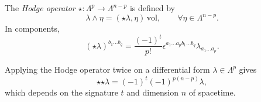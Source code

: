 \begin{definition}
  The \emph{Hodge operator} $\star \colon \Lambda^p \to \Lambda^{n -p}$ is defined by
  \begin{equation}
    \lambda \wedge \eta = (\star \lambda, \eta) \, \text{vol}, \qquad \forall \eta \in \Lambda^{n - p}.
  \end{equation}
  In components,
  \begin{equation}
    (\star \lambda)^{b_1 \dots b_q} = \frac{(-1)^{t}}{p!} \epsilon^{a_1 \dots a_p b_1 \dots b_q}  \lambda_{a_1 \dots a_p}.
  \end{equation}
\end{definition}
\begin{claim}
  Applying the Hodge operator twice on a differential form $\lambda \in \Lambda^p$ gives
  \begin{equation}
    {\star {\star \lambda}} = (-1)^t (-1)^{p (n - p)} \lambda,
  \end{equation}
  which depends on the signature $t$ and dimension $n$ of spacetime.
\end{claim}

